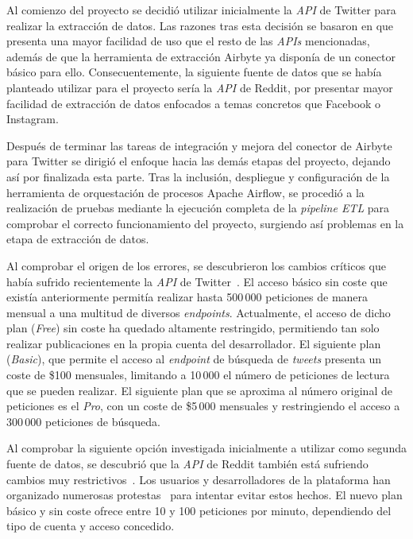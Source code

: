 Al comienzo del proyecto se decidió utilizar inicialmente la \textit{API} de Twitter para realizar la extracción de datos. Las razones tras esta decisión se basaron en que presenta una mayor facilidad de uso que el resto de las \textit{APIs} mencionadas, además de que la herramienta de extracción Airbyte ya disponía de un conector básico para ello. Consecuentemente, la siguiente fuente de datos que se había planteado utilizar para el proyecto sería la \textit{API} de Reddit, por presentar mayor facilidad de extracción de datos enfocados a temas concretos que Facebook o Instagram.

 Después de terminar las tareas de integración y mejora del conector de Airbyte para Twitter se dirigió el enfoque hacia las demás etapas del proyecto, dejando así por finalizada esta parte. Tras la inclusión, despliegue y configuración de la herramienta de orquestación de procesos Apache Airflow, se procedió a la realización de pruebas mediante la ejecución completa de la \textit{pipeline ETL} para comprobar el correcto funcionamiento del proyecto, surgiendo así problemas en la etapa de extracción de datos.

Al comprobar el origen de los errores, se descubrieron los cambios críticos que había sufrido recientemente la \textit{API} de Twitter~\cite{karissa2023, stokel2023}. El acceso básico sin coste que existía anteriormente permitía realizar hasta 500\,000 peticiones de manera mensual a una multitud de diversos \textit{endpoints}. Actualmente, el acceso de dicho plan (\textit{Free}) sin coste ha quedado altamente restringido, permitiendo tan solo realizar publicaciones en la propia cuenta del desarrollador. El siguiente plan (\textit{Basic}), que permite el acceso al \textit{endpoint} de búsqueda de \textit{tweets} presenta un coste de \$100 mensuales, limitando a 10\,000 el número de peticiones de lectura que se pueden realizar. El siguiente plan que se aproxima al número original de peticiones es el \textit{Pro}, con un coste de \$5\,000 mensuales y restringiendo el acceso a 300\,000 peticiones de búsqueda.

Al comprobar la siguiente opción investigada inicialmente a utilizar como segunda fuente de datos, se descubrió que la \textit{API} de Reddit también está sufriendo cambios muy restrictivos~\cite{watercutter2023}. Los usuarios y desarrolladores de la plataforma han organizado numerosas protestas~\cite{antonio2023} para intentar evitar estos hechos. El nuevo plan básico y sin coste ofrece entre 10 y 100 peticiones por minuto, dependiendo del tipo de cuenta y acceso concedido.


